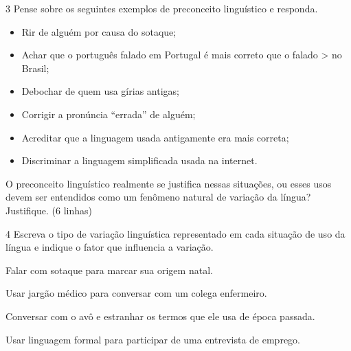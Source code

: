 \num{3} Pense sobre os seguintes exemplos de preconceito linguístico e
responda.

\begin{itemize}
\item
  Rir de alguém por causa do sotaque;
\item
  Achar que o português falado em Portugal é mais correto que o falado
  \textgreater{} no Brasil;
\item
  Debochar de quem usa gírias antigas;
\item
  Corrigir a pronúncia ``errada'' de alguém;
\item
  Acreditar que a linguagem usada antigamente era mais correta;
\item
  Discriminar a linguagem simplificada usada na internet.
\end{itemize}

O preconceito linguístico realmente se justifica nessas situações, ou
esses usos devem ser entendidos como um fenômeno natural de variação da
língua? Justifique. (6 linhas)


\num{4} Escreva o tipo de variação linguística representado em cada
situação de uso da língua e indique o fator que influencia a variação.

\begin{escolha}

\item Falar com sotaque para marcar sua origem natal.


\item Usar jargão médico para conversar com um colega enfermeiro.


\item Conversar com o avô e estranhar os termos que ele usa de época passada.


\item Usar linguagem formal para participar de uma entrevista de emprego.

\end{escolha}


